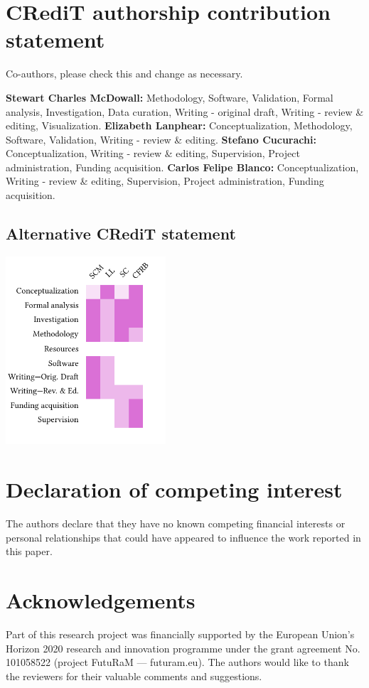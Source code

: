 \documentclass[final,5p,authoryear]{elsarticle}
\newcommand{\cbox}[1]{
    \begin{tcolorbox}[hbox, colback=red!5!white, colframe=red!65!black, boxrule=0.25pt, boxsep=2pt, left=2pt, right=2pt, top=1pt, bottom=1pt]
        \small\sffamily #1
    \end{tcolorbox}
}
\begin{document}
\section*{CRediT authorship contribution statement}
\cbox{Co-authors, please check this and change as necessary.}
\textbf{Stewart Charles McDowall:} Methodology, Software, Validation, Formal analysis, Investigation, Data curation, Writing - original draft, Writing - review \& editing, Visualization.
\textbf{Elizabeth Lanphear:} Conceptualization, Methodology, Software, Validation, Writing - review \& editing.
\textbf{Stefano Cucurachi:} Conceptualization, Writing - review \& editing, Supervision, Project administration, Funding acquisition.
\textbf{Carlos Felipe Blanco:} Conceptualization, Writing - review \& editing, Supervision, Project administration, Funding acquisition.

\subsection*{Alternative CRediT statement}

\includegraphics[width=\columnwidth, height=7cm, keepaspectratio]{credit.pdf}

\section*{Declaration of competing interest}
The authors declare that they have no known competing financial interests or personal relationships that could have appeared to influence the work reported in this paper.

\section*{Acknowledgements}
    Part of this research project was financially supported by the European Union's Horizon 2020 research and innovation programme under the grant agreement No. 101058522 (project FutuRaM --- futuram.eu). The authors would like to thank the reviewers for their valuable comments and suggestions.
\end{document}
